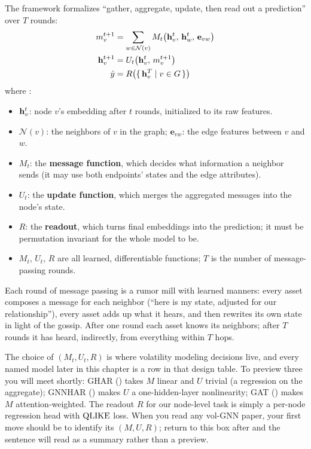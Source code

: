The framework formalizes ``gather, aggregate, update, then read out a prediction'' over $T$ rounds:
\begin{align}
  m_v^{t+1} &= \sum_{w \in \mathcal{N}(v)} M_t\!\left(\mathbf{h}_v^t,\, \mathbf{h}_w^t,\, \mathbf{e}_{vw}\right) \label{eq:gnn:mpnn-message}\\
  \mathbf{h}_v^{t+1} &= U_t\!\left(\mathbf{h}_v^t,\, m_v^{t+1}\right) \label{eq:gnn:mpnn-update}\\
  \hat{y} &= R\!\left(\{\, \mathbf{h}_v^T \mid v \in G \,\}\right) \label{eq:gnn:mpnn-readout}
\end{align}
where \citep[eqs.~1--3, p.~3]{Gilmer2017}:
\begin{itemize}[nosep]
  \item $\mathbf{h}_v^t$: node $v$'s embedding after $t$ rounds, initialized to its raw features.
  \item $\mathcal{N}(v)$: the neighbors of $v$ in the graph; $\mathbf{e}_{vw}$: the edge features between $v$ and $w$.
  \item $M_t$: the \textbf{message function}, which decides what information a neighbor sends (it may use both endpoints' states and the edge attributes).
  \item $U_t$: the \textbf{update function}, which merges the aggregated messages into the node's state.
  \item $R$: the \textbf{readout}, which turns final embeddings into the prediction; it must be permutation invariant for the whole model to be.
  \item $M_t$, $U_t$, $R$ are all learned, differentiable functions; $T$ is the number of message-passing rounds.
\end{itemize}

\begin{intuition}
Each round of message passing is a rumor mill with learned manners: every asset composes a message for each neighbor (``here is my state, adjusted for our relationship''), every asset adds up what it hears, and then rewrites its own state in light of the gossip. After one round each asset knows its neighbors; after $T$ rounds it has heard, indirectly, from everything within $T$ hops.
\end{intuition}

\begin{projectconnection}
The choice of $(M_t, U_t, R)$ is where volatility modeling decisions live, and every named model later in this chapter is a row in that design table. To preview three you will meet shortly: GHAR () takes $M$ linear and $U$ trivial (a regression on the aggregate); GNNHAR () makes $U$ a one-hidden-layer nonlinearity; GAT () makes $M$ attention-weighted. The readout $R$ for our node-level task is simply a per-node regression head with $\operatorname{QLIKE}$ loss. When you read any vol-GNN paper, your first move should be to identify its $(M, U, R)$; return to this box after  and the sentence will read as a summary rather than a preview.
\end{projectconnection}

